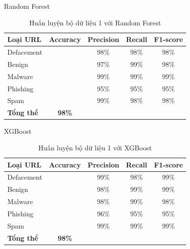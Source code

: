 \documentclass[13pt]{article}
\begin{document}
Random Forest
\newpage
\begin{table}[h]
    \centering
    \renewcommand{\arraystretch}{1.3} %
    \begin{tabular}{|l|c|c|c|c|}
        \hline
        \rowcolor[HTML]{C0C0C0} %
        \textbf{Loại URL} & \textbf{Accuracy} & \textbf{Precision} & \textbf{Recall} & \textbf{F1-score} \\ 
        \hline
        Defacement &  & 98\% & 98\% & 98\% \\ 
        \hline
        Benign &  & 97\% & 99\% & 98\% \\ 
        \hline
        Malware &  & 99\% & 99\% & 99\% \\ 
        \hline
        Phishing &  & 95\% & 95\% & 95\% \\ 
        \hline
        Spam &  & 99\% & 98\% & 98\% \\ 
        \hline
        \textbf{Tổng thể} & \textbf{98\%} &  &  &  \\ 
        \hline
    \end{tabular}
    \caption{Huấn luyện bộ dữ liệu 1 với Random Forest}
    \label{tab:logistic_regression}
\end{table}

XGBoost
\begin{table}[h]
    \centering
    \renewcommand{\arraystretch}{1.3} %
    \begin{tabular}{|l|c|c|c|c|}
        \hline
        \rowcolor[HTML]{C0C0C0} %
        \textbf{Loại URL} & \textbf{Accuracy} & \textbf{Precision} & \textbf{Recall} & \textbf{F1-score} \\ 
        \hline
        Defacement &  & 99\% & 98\% & 99\% \\ 
        \hline
        Benign &  & 98\% & 99\% & 99\% \\ 
        \hline
        Malware &  & 98\% & 99\% & 98\% \\ 
        \hline
        Phishing &  & 96\% & 95\% & 95\% \\ 
        \hline
        Spam &  & 99\% & 99\% & 99\% \\ 
        \hline
        \textbf{Tổng thể} & \textbf{98\%} &  &  &  \\ 
        \hline
    \end{tabular}
    \caption{Huấn luyện bộ dữ liệu 1 với XGBoost}
    \label{tab:logistic_regression}
\end{table}
\end{document}
